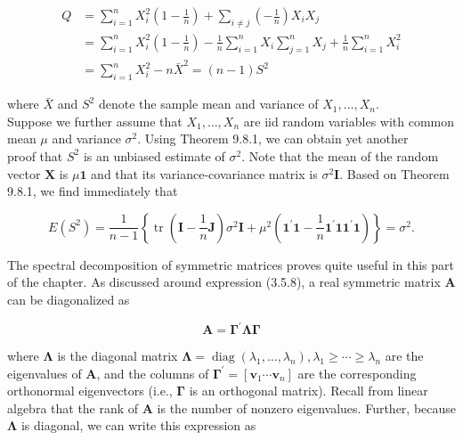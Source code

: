 \begin{align*}
Q & =\sum_{i=1}^{n} X_{i}^{2}\left(1-\frac{1}{n}\right)+\sum_{i \neq j}\left(-\frac{1}{n}\right) X_{i} X_{j} \\
& =\sum_{i=1}^{n} X_{i}^{2}\left(1-\frac{1}{n}\right)-\frac{1}{n} \sum_{i=1}^{n} X_{i} \sum_{j=1}^{n} X_{j}+\frac{1}{n} \sum_{i=1}^{n} X_{i}^{2} \\
& =\sum_{i=1}^{n} X_{i}^{2}-n \bar{X}^{2}=(n-1) S^{2} \tag{9.8.7}
\end{align*}


where $\bar{X}$ and $S^{2}$ denote the sample mean and variance of $X_{1}, \ldots, X_{n}$.\\
Suppose we further assume that $X_{1}, \ldots, X_{n}$ are iid random variables with common mean $\mu$ and variance $\sigma^{2}$. Using Theorem 9.8.1, we can obtain yet another\\
proof that $S^{2}$ is an unbiased estimate of $\sigma^{2}$. Note that the mean of the random vector $\mathbf{X}$ is $\mu \mathbf{1}$ and that its variance-covariance matrix is $\sigma^{2} \mathbf{I}$. Based on Theorem 9.8.1, we find immediately that

$$
E\left(S^{2}\right)=\frac{1}{n-1}\left\{\operatorname{tr}\left(\mathbf{I}-\frac{1}{n} \mathbf{J}\right) \sigma^{2} \mathbf{I}+\mu^{2}\left(\mathbf{1}^{\prime} \mathbf{1}-\frac{1}{n} \mathbf{1}^{\prime} \mathbf{1} \mathbf{1}^{\prime} \mathbf{1}\right)\right\}=\sigma^{2} .
$$

The spectral decomposition of symmetric matrices proves quite useful in this part of the chapter. As discussed around expression (3.5.8), a real symmetric matrix $\mathbf{A}$ can be diagonalized as


\begin{equation*}
\mathbf{A}=\boldsymbol{\Gamma}^{\prime} \boldsymbol{\Lambda} \boldsymbol{\Gamma} \tag{9.8.8}
\end{equation*}


where $\boldsymbol{\Lambda}$ is the diagonal matrix $\boldsymbol{\Lambda}=\operatorname{diag}\left(\lambda_{1}, \ldots, \lambda_{n}\right), \lambda_{1} \geq \cdots \geq \lambda_{n}$ are the eigenvalues of $\mathbf{A}$, and the columns of $\boldsymbol{\Gamma}^{\prime}=\left[\mathbf{v}_{1} \cdots \mathbf{v}_{n}\right]$ are the corresponding orthonormal eigenvectors (i.e., $\boldsymbol{\Gamma}$ is an orthogonal matrix). Recall from linear algebra that the rank of $\mathbf{A}$ is the number of nonzero eigenvalues. Further, because $\boldsymbol{\Lambda}$ is diagonal, we can write this expression as


